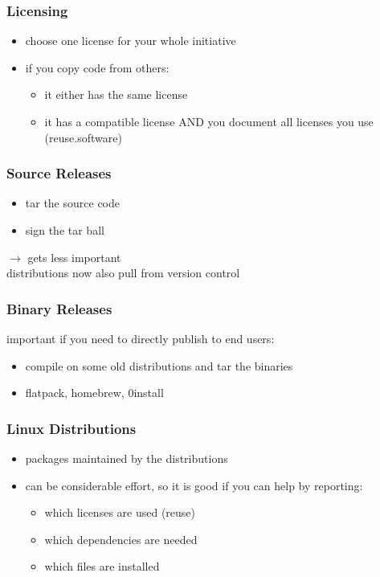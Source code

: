 \begin{frame}
	\frametitle{Licensing}

	\begin{itemize}[<+-| alert@+>]
	\item choose one license for your whole initiative
	\item if you copy code from others:
	\begin{itemize}
	\item it either has the same license
	\item it has a compatible license AND you document all licenses you use (reuse.software)
	\end{itemize}
	\end{itemize}
\end{frame}

\begin{frame}
	\frametitle{Source Releases}

	\begin{itemize}[<+-| alert@+>]
	\item tar the source code
	\item sign the tar ball
	\end{itemize}

	\pause[\thebeamerpauses]  %
	\vspace{1cm}

	$\rightarrow$ gets less important \\
	distributions now also pull from version control
\end{frame}

\begin{frame}
	\frametitle{Binary Releases}

	important if you need to directly publish to end users:

	\begin{itemize}[<+-| alert@+>]
	\item compile on some old distributions and tar the binaries
	\item flatpack, homebrew, 0install
	\end{itemize}
\end{frame}

\begin{frame}
	\frametitle{Linux Distributions}

	\begin{itemize}[<+-| alert@+>]
	\item packages maintained by the distributions
	\item can be considerable effort, so it is good if you can help by reporting:
	\begin{itemize}
	\item which licenses are used (reuse)
	\item which dependencies are needed
	\item which files are installed
	\end{itemize}
	\end{itemize}
\end{frame}


